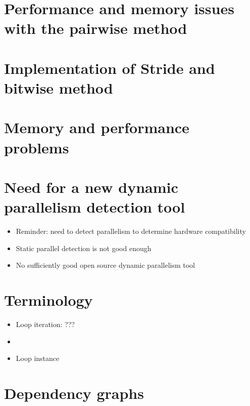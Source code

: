 \documentclass[12pt,twoside]{reedthesis}
\begin{document}
	\section{Performance and memory issues with the pairwise method}
	\section{Implementation of Stride and bitwise method}
	\section{Memory and performance problems}
	
		
			
		

	\section{Need for a new dynamic parallelism detection tool}
	
		\begin{itemize}
			\item Reminder: need to detect parallelism to determine hardware compatibility
			\item Static parallel detection is not good enough
			\item No sufficiently good open source dynamic parallelism tool
		\end{itemize}
	
		
		
		
	\section{Terminology}
		
		\begin{itemize}
			\item Loop iteration: ???
			\item 
			\item Loop instance
		\end{itemize}
	
	\section{Dependency graphs}
	
\end{document}
